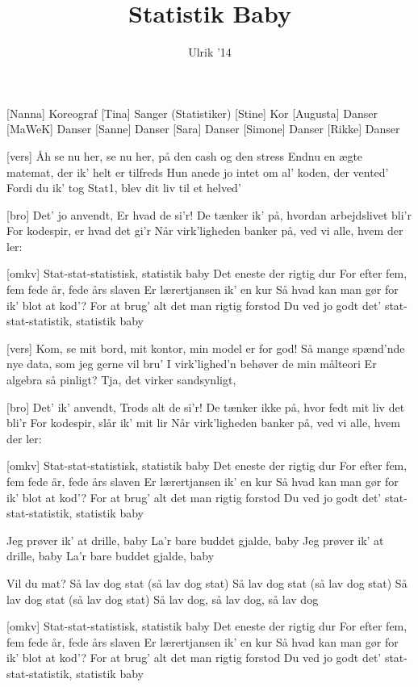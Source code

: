 \documentclass[a4paper,11pt]{article}
\title{Statistik Baby}
\author{Ulrik '14}
\begin{document}
\maketitle

\begin{roles}
[Nanna] Koreograf
[Tina] Sanger (Statistiker) 
[Stine] Kor
[Augusta] Danser
[MaWeK] Danser
[Sanne] Danser
[Sara] Danser
[Simone] Danser
[Rikke] Danser
\end{roles}

\begin{song}
[vers]%
Åh se nu her, se nu her, på den cash og den stress
Endnu en ægte matemat, der ik' helt er tilfreds
Hun anede jo intet om al' koden, der vented'
Fordi du ik' tog Stat1, blev dit liv til et helved'

[bro]%
Det' jo anvendt,
Er hvad de si'r!
De tænker ik' på, hvordan arbejdslivet bli'r
For kodespir, er hvad det gi'r
Når virk'ligheden banker på, ved vi alle, hvem der ler:

[omkv]%
Stat-stat-statistisk, statistik baby
Det eneste der rigtig dur
For efter fem, fem fede år, fede års slaven
Er lærertjansen ik' en kur
Så hvad kan man gør for ik' blot at kod'?
For at brug' alt det man rigtig forstod
Du ved jo godt det' stat-stat-statistik, statistik baby

[vers]%
Kom, se mit bord, mit kontor, min model er for god!
Så mange spænd'nde nye data, som jeg gerne vil bru'
I virk'lighed'n behøver de min målteori
Er algebra så pinligt? Tja, det virker sandsynligt,

[bro]%
Det' ik’ anvendt,
Trods alt de si'r!
De tænker ikke på, hvor fedt mit liv det bli'r
For kodespir, slår ik' mit lir
Når virk'ligheden banker på, ved vi alle, hvem der ler:

[omkv]%
Stat-stat-statistisk, statistik baby
Det eneste der rigtig dur
For efter fem, fem fede år, fede års slaven
Er lærertjansen ik' en kur
Så hvad kan man gør for ik' blot at kod'?
For at brug' alt det man rigtig forstod
Du ved jo godt det' stat-stat-statistik, statistik baby

%
Jeg prøver ik' at drille, baby
La'r bare buddet gjalde, baby
Jeg prøver ik' at drille, baby
La'r bare buddet gjalde, baby

%
Vil du mat? Så lav dog stat (så lav dog stat)
Så lav dog stat (så lav dog stat)
Så lav dog stat (så lav dog stat)
Så lav dog, så lav dog, så lav dog

[omkv]%
Stat-stat-statistisk, statistik baby
Det eneste der rigtig dur
For efter fem, fem fede år, fede års slaven
Er lærertjansen ik' en kur
Så hvad kan man gør for ik' blot at kod'?
For at brug' alt det man rigtig forstod
Du ved jo godt det' stat-stat-statistik, statistik baby
\end{song}
\end{document}
